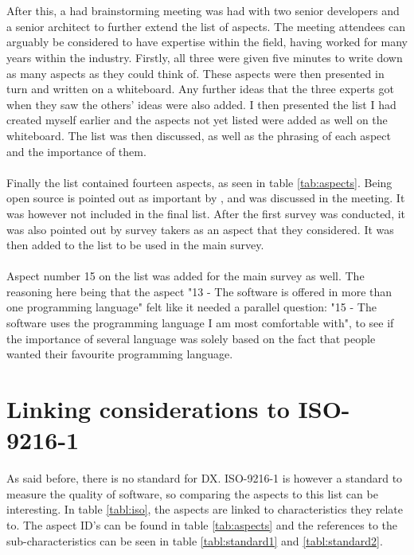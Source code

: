 \documentclass{cslthse-msc}
\begin{document}
    \\ \\
    After this, a had brainstorming meeting was had with two senior developers and a
    senior architect to further extend the list of aspects. The meeting attendees can arguably be considered
    to have expertise within the field, having worked for many years within the industry.
    Firstly, all three
    were given five minutes to write down as many aspects as they could think of.
    These aspects were then presented in turn and written on a whiteboard. Any further ideas
    that the three experts got when they saw the others' ideas were also added.
    I then presented the list I had created myself earlier and the aspects not yet listed were added
    as well on the whiteboard. The list was then discussed, as well as the phrasing of each aspect and the importance
    of them.
    \\ \\
    Finally the list contained fourteen aspects, as seen in table \ref{tab:aspects}.
    Being open source is pointed out as important by \citet{jarman}, and was discussed in the meeting.
    It was however not included in the final list. After the first survey was conducted, it was
    also pointed out by survey takers as an aspect that they considered. It was then
    added to the list to be used in the main survey.
    \\ \\
    Aspect number 15 on the list was
    added for the main survey as well. The reasoning here being that the aspect
    "13 - The software is offered in more than one programming language" felt
    like it needed a parallel question: "15 - The software uses the programming language I am most comfortable with",
    to see if the importance of several language was solely based on the fact that
    people wanted their favourite programming language.


    \section{Linking considerations to ISO-9216-1}

    As said before, there is no standard for DX. ISO-9216-1 is however a standard
    to measure the quality of software, so comparing the aspects to this list can
    be interesting. In table \ref{tabl:iso}, the aspects are linked to characteristics they relate to. The aspect ID's can
    be found in table \ref{tab:aspects} and the references to the sub-characteristics can be seen in table \ref{tabl:standard1} and \ref{tabl:standard2}.
\end{document}
